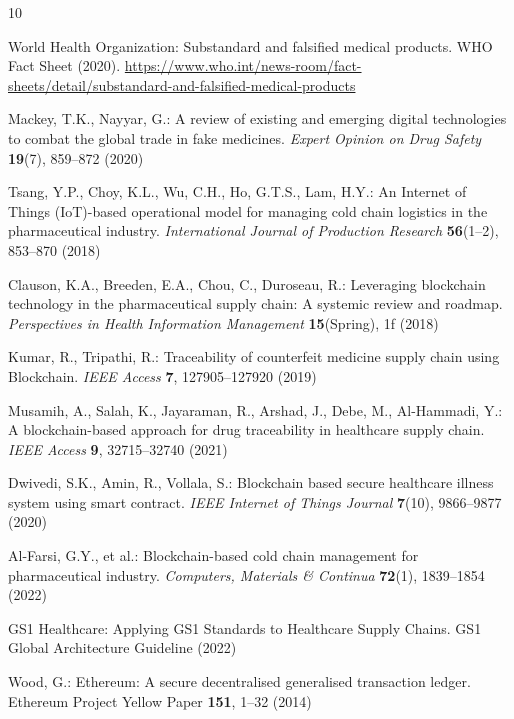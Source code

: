 \documentclass[11pt,a4paper]{article}
\begin{document}
\begin{thebibliography}{10}

World Health Organization: Substandard and falsified medical products. WHO Fact Sheet (2020). \url{https://www.who.int/news-room/fact-sheets/detail/substandard-and-falsified-medical-products}

Mackey, T.K., Nayyar, G.: A review of existing and emerging digital technologies to combat the global trade in fake medicines. \textit{Expert Opinion on Drug Safety} \textbf{19}(7), 859--872 (2020)

Tsang, Y.P., Choy, K.L., Wu, C.H., Ho, G.T.S., Lam, H.Y.: An Internet of Things (IoT)-based operational model for managing cold chain logistics in the pharmaceutical industry. \textit{International Journal of Production Research} \textbf{56}(1--2), 853--870 (2018)

Clauson, K.A., Breeden, E.A., Chou, C., Duroseau, R.: Leveraging blockchain technology in the pharmaceutical supply chain: A systemic review and roadmap. \textit{Perspectives in Health Information Management} \textbf{15}(Spring), 1f (2018)

Kumar, R., Tripathi, R.: Traceability of counterfeit medicine supply chain using Blockchain. \textit{IEEE Access} \textbf{7}, 127905--127920 (2019)

Musamih, A., Salah, K., Jayaraman, R., Arshad, J., Debe, M., Al-Hammadi, Y.: A blockchain-based approach for drug traceability in healthcare supply chain. \textit{IEEE Access} \textbf{9}, 32715--32740 (2021)

Dwivedi, S.K., Amin, R., Vollala, S.: Blockchain based secure healthcare illness system using smart contract. \textit{IEEE Internet of Things Journal} \textbf{7}(10), 9866--9877 (2020)

Al-Farsi, G.Y., et al.: Blockchain-based cold chain management for pharmaceutical industry. \textit{Computers, Materials \& Continua} \textbf{72}(1), 1839--1854 (2022)

GS1 Healthcare: Applying GS1 Standards to Healthcare Supply Chains. GS1 Global Architecture Guideline (2022)

Wood, G.: Ethereum: A secure decentralised generalised transaction ledger. Ethereum Project Yellow Paper \textbf{151}, 1--32 (2014)

\end{thebibliography}
\end{document}

